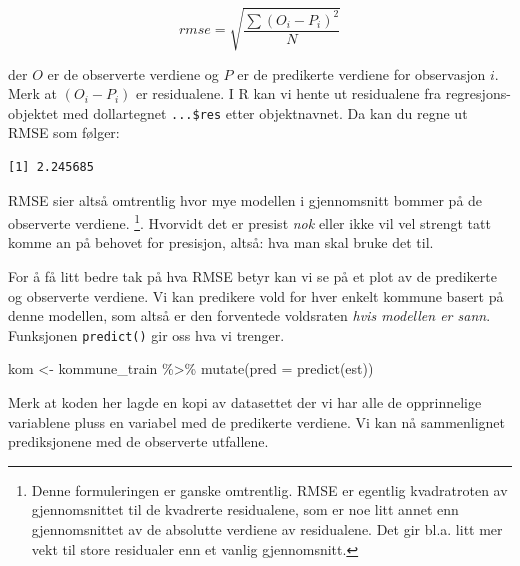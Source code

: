 \documentclass[
  letterpaper,
  DIV=11,
  numbers=noendperiod]{scrreprt}
\newenvironment{Shaded}{\begin{snugshade}}{\end{snugshade}}
\newcommand{\AttributeTok}[1]{\textcolor[rgb]{0.40,0.45,0.13}{#1}}
\newcommand{\DecValTok}[1]{\textcolor[rgb]{0.68,0.00,0.00}{#1}}
\newcommand{\FunctionTok}[1]{\textcolor[rgb]{0.28,0.35,0.67}{#1}}
\newcommand{\NormalTok}[1]{\textcolor[rgb]{0.00,0.23,0.31}{#1}}
\newcommand{\OtherTok}[1]{\textcolor[rgb]{0.00,0.23,0.31}{#1}}
\newcommand{\SpecialCharTok}[1]{\textcolor[rgb]{0.37,0.37,0.37}{#1}}
\begin{document}
\[ rmse = \sqrt{ \frac{ \sum{(O_i-P_i)^2} }{N} }  \]

der \(O\) er de observerte verdiene og \(P\) er de predikerte verdiene
for observasjon \(i\). Merk at \((O_i-P_i)\) er residualene. I R kan vi
hente ut residualene fra regresjons-objektet med dollartegnet
\texttt{...\$res} etter objektnavnet. Da kan du regne ut RMSE som
følger:

\begin{Shaded}
\end{Shaded}

\begin{verbatim}
[1] 2.245685
\end{verbatim}

RMSE sier altså omtrentlig hvor mye modellen i gjennomsnitt bommer på de
observerte verdiene. \footnote{Denne formuleringen er ganske omtrentlig.
  RMSE er egentlig kvadratroten av gjennomsnittet til de kvadrerte
  residualene, som er noe litt annet enn gjennomsnittet av de absolutte
  verdiene av residualene. Det gir bl.a. litt mer vekt til store
  residualer enn et vanlig gjennomsnitt.}. Hvorvidt det er presist
\emph{nok} eller ikke vil vel strengt tatt komme an på behovet for
presisjon, altså: hva man skal bruke det til.

For å få litt bedre tak på hva RMSE betyr kan vi se på et plot av de
predikerte og observerte verdiene. Vi kan predikere vold for hver enkelt
kommune basert på denne modellen, som altså er den forventede voldsraten
\emph{hvis modellen er sann}. Funksjonen \texttt{predict()} gir oss hva
vi trenger.

\begin{Shaded}
\begin{Highlighting}[]
\NormalTok{kom }\OtherTok{\textless{}{-}}\NormalTok{ kommune\_train }\SpecialCharTok{\%\textgreater{}\%}
  \FunctionTok{mutate}\NormalTok{(}\AttributeTok{pred =} \FunctionTok{predict}\NormalTok{(est))}
\end{Highlighting}
\end{Shaded}

Merk at koden her lagde en kopi av datasettet der vi har alle de
opprinnelige variablene pluss en variabel med de predikerte verdiene. Vi
kan nå sammenlignet prediksjonene med de observerte utfallene.
\end{document}
